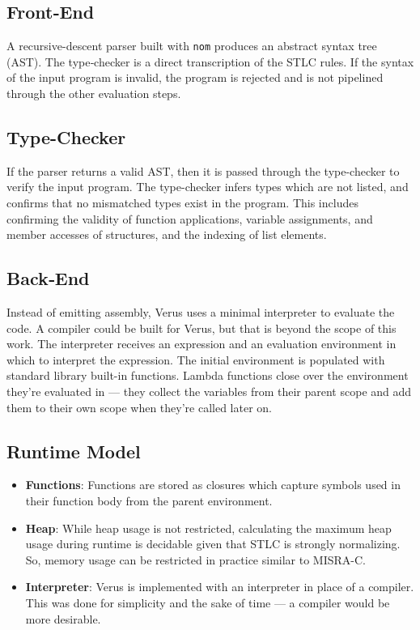 \documentclass[conference]{IEEEtran}
\begin{document}
\subsection{Front‑End}
A recursive-descent parser built with \texttt{nom} produces an abstract syntax tree (AST). The type‑checker is a direct transcription of the STLC rules. If the syntax of the input program is invalid, the program is rejected and is not pipelined through the other evaluation steps.

\subsection{Type-Checker}

If the parser returns a valid AST, then it is passed through the type-checker to verify the input program. The type-checker infers types which are not listed, and confirms that no mismatched types exist in the program. This includes confirming the validity of function applications, variable assignments, and member accesses of structures, and the indexing of list elements.

\subsection{Back‑End}
Instead of emitting assembly, Verus uses a minimal interpreter to evaluate the code. A compiler could be built for Verus, but that is beyond the scope of this work. The interpreter receives an expression and an evaluation environment in which to interpret the expression. The initial environment is populated with standard library built-in functions. Lambda functions close over the environment they're evaluated in --- they collect the variables from their parent scope and add them to their own scope when they're called later on.

\subsection{Runtime Model}
\begin{itemize}[nosep]
\item \textbf{Functions}: Functions are stored as closures which capture symbols used in their function body from the parent environment.
\item \textbf{Heap}: While heap usage is not restricted, calculating the maximum heap usage during runtime is decidable given that STLC is strongly normalizing. So, memory usage can be restricted in practice similar to MISRA-C.
\item \textbf{Interpreter}: Verus is implemented with an interpreter in place of a compiler. This was done for simplicity and the sake of time --- a compiler would be more desirable.
\end{itemize}
\end{document}
